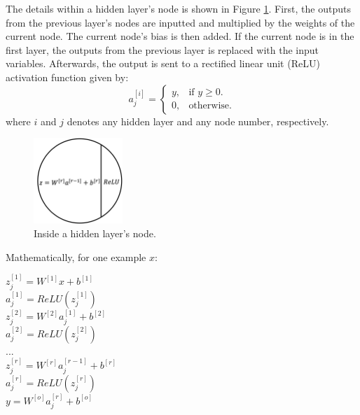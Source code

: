 The details within a hidden layer's node is shown in Figure \ref{fig:08NNNode}. First, the outputs from the previous layer's nodes are inputted and multiplied by the weights of the current node.  The current node's bias is then added. If the current node is in the first layer, the outputs from the previous layer is replaced with the input variables. Afterwards, the output is sent to a rectified linear unit (ReLU) activation function given by:
\begin{equation}
    a^{[i]}_j=\begin{cases}
        y, & \text{if $y\geq0$}.\\
        0, & \text{otherwise}.
    \end{cases}
    \label{eq:08ReLU}
\end{equation}
where $i$ and $j$ denotes any hidden layer and any node number, respectively.  
\begin{figure}[h]
    \centering
    \includegraphics[width=0.3\textwidth]{images/suncor/08NNNode.png}
    \caption{Inside a hidden layer's node.}
    \label{fig:08NNNode}
\end{figure}

Mathematically, for one example $x$:
\begin{center}
    $z^{[1]}_j = W^{[1]}x + b^{[1]}$ \\
    $a^{[1]}_j = ReLU(z^{[1]}_j)$ \\
    $z^{[2]}_j = W^{[2]}a^{[1]}_j + b^{[2]}$ \\
    $a^{[2]}_j = ReLU(z^{[2]}_j)$ \\
    ... \\
    $z^{[r]}_j = W^{[r]}a^{[r - 1]}_j + b^{[r]}$ \\
    $a^{[r]}_j = ReLU(z^{[r]}_j)$ \\
    $y = W^{[o]}a^{[r]}_j + b^{[o]}$ \\  
\end{center}

